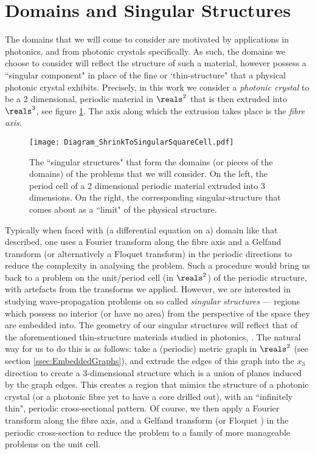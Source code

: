 \section{Domains and Singular Structures} \label{sec:SingularStructures}


The domains that we will come to consider are motivated by applications in photonics, and from photonic crystals specifically.
As such, the domains we choose to consider will reflect the structure of such a material, however possess a ``singular component" in place of the fine or `thin-structure" that a physical photonic crystal exhibits.
Precisely, in this work we consider a \emph{photonic crystal} to be a 2 dimensional, periodic material in $\reals^2$ that is then extruded into $\reals^3$, see figure \ref{fig:Diagram_ShrinkToSingularSquareCell}.
The axis along which the extrusion takes place is the \emph{fibre axis}.
\begin{figure}
	\centering
	\texttt{[image: Diagram\_ShrinkToSingularSquareCell.pdf]}
	\caption{\label{fig:Diagram_ShrinkToSingularSquareCell} The ``singular structures" that form the domains (or pieces of the domains) of the problems that we will consider. On the left, the period cell of a 2 dimensional periodic material extruded into 3 dimensions. On the right, the corresponding singular-structure that comes about as a ``limit" of the physical structure.}
\end{figure}
Typically when faced with (a differential equation on a) domain like that described, one uses a Fourier transform along the fibre axis and a Gelfand transform (or alternatively a Floquet transform) in the periodic directions to reduce the complexity in analysing the problem.
Such a procedure would bring us back to a problem on the unit/period cell (in $\reals^2$) of the periodic structure, with artefacts from the transforms we applied.
However, we are interested in studying wave-propagation problems on so called \emph{singular structures} --- regions which possess no interior (or have no area) from the perspective of the space they are embedded into.
The geometry of our singular structures will reflect that of the aforementioned thin-structure materials studied in photonics, .
The natural way for us to do this is as follows: take a (periodic) metric graph in $\reals^2$ (see section \ref{ssec:EmbeddedGraphs}), and extrude the edges of this graph into the $x_3$ direction to create a 3-dimensional structure which is a union of planes induced by the graph edges.
This creates a region that mimics the structure of a photonic crystal (or a photonic fibre yet to have a core drilled out), with an ``infinitely thin", periodic cross-sectional pattern.
Of course, we then apply a Fourier transform along the fibre axis, and a Gelfand transform (or Floquet ) in the periodic cross-section to reduce the problem to a family of more manageable problems on the unit cell.

